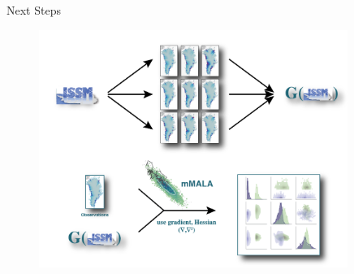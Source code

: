 \documentclass[aspectratio=169,hide notes,intlimits]{beamer}
\begin{document}
\begin{frame}{Next Steps}
    \begin{figure}
      \includegraphics[height=7.75cm]{surrogate_model_issm}
    \end{figure}
\end{frame}
\end{document}
